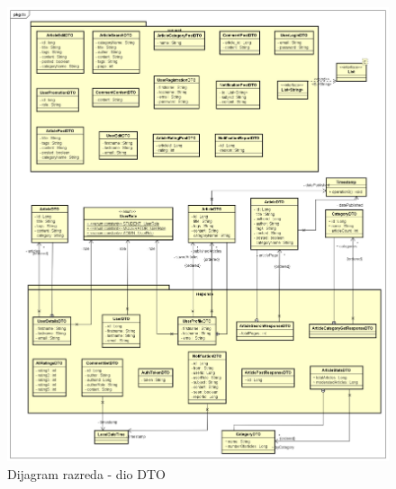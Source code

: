 \eject

\begin{figure}[H]
	\includegraphics[scale=0.4]{slike/Class Diagram DTO.png}
	\centering
	\caption{Dijagram razreda - dio DTO}
	\label{fig:class_diagram_dto}
\end{figure}

\eject

